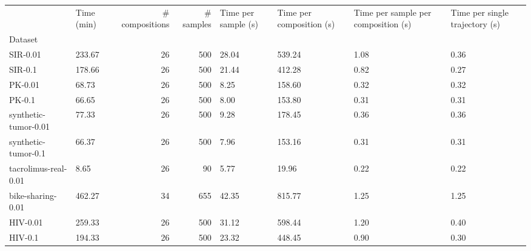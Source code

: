\begin{tabular}{llrrllll}
\toprule
 & Time (min) & # compositions & # samples & Time per sample (s) & Time per composition (s) & Time per sample per composition (s) & Time per single trajectory (s) \\
Dataset &  &  &  &  &  &  &  \\
\midrule
SIR-0.01 & 233.67 & 26 & 500 & 28.04 & 539.24 & 1.08 & 0.36 \\
SIR-0.1 & 178.66 & 26 & 500 & 21.44 & 412.28 & 0.82 & 0.27 \\
PK-0.01 & 68.73 & 26 & 500 & 8.25 & 158.60 & 0.32 & 0.32 \\
PK-0.1 & 66.65 & 26 & 500 & 8.00 & 153.80 & 0.31 & 0.31 \\
synthetic-tumor-0.01 & 77.33 & 26 & 500 & 9.28 & 178.45 & 0.36 & 0.36 \\
synthetic-tumor-0.1 & 66.37 & 26 & 500 & 7.96 & 153.16 & 0.31 & 0.31 \\
tacrolimus-real-0.01 & 8.65 & 26 & 90 & 5.77 & 19.96 & 0.22 & 0.22 \\
bike-sharing-0.01 & 462.27 & 34 & 655 & 42.35 & 815.77 & 1.25 & 1.25 \\
HIV-0.01 & 259.33 & 26 & 500 & 31.12 & 598.44 & 1.20 & 0.40 \\
HIV-0.1 & 194.33 & 26 & 500 & 23.32 & 448.45 & 0.90 & 0.30 \\
\bottomrule
\end{tabular}

